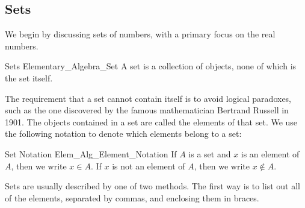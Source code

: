 \documentclass[crop=false,class=book,oneside]{standalone}
\begin{document}
        \subsection{Sets}
            We begin by discussing sets of numbers,
            with a primary focus on the real numbers.
            \begin{fdefinition}{Sets}
                {Elementary_Algebra_Set}
                A set is a collection of objects,
                none of which is the set itself.
            \end{fdefinition}
            The requirement that a set cannot contain itself
            is to avoid logical paradoxes, such as the one
            discovered by the famous mathematician
            Bertrand Russell in 1901. The objects contained
            in a set are called the elements of that set. We use
            the following notation to denote
            which elements belong to a set:
            \begin{fnotation}{Set Notation}
                {Elem_Alg_Element_Notation}
                If $A$ is a set and $x$ is an element
                of $A$, then we write $x\in{A}$.
                If $x$ is not an element of $A$,
                then we write $x\notin{A}$.
            \end{fnotation}
            Sets are usually described by one of
            two methods. The first way is to list out
            all of the elements, separated by commas,
            and enclosing them in braces.
\end{document}
